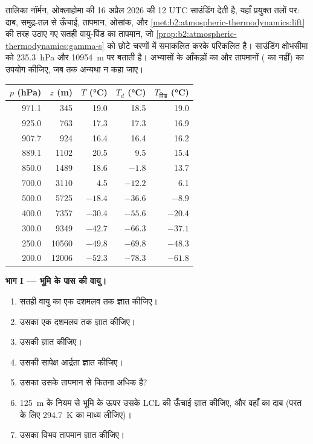 \begin{problem}[{सप्ताहांत समस्या --- सुबह की साउंडिंग पढ़ना}]\label{pb:b2:atmospheric-thermodynamics:1}
तालिका नॉर्मन, ओक्लाहोमा की 16 अप्रैल 2026 की 12 UTC साउंडिंग देती है, यहाँ प्रयुक्त
तलों पर: दाब, समुद्र-तल से ऊँचाई, तापमान, ओसांक, और
\cref{met:b2:atmospheric-thermodynamics:lift} की तरह उठाए गए सतही वायु-पिंड का तापमान, जो
\cref{prop:b2:atmospheric-thermodynamics:gamma-s} को छोटे चरणों में समाकलित करके परिकलित है। साउंडिंग
क्षोभसीमा को \qty{235.3}{hPa} और \qty{10954}{m} पर बताती है। अभ्यासों के आँकड़ों का और
तापमानों ( का नहीं) का उपयोग कीजिए, जब तक अन्यथा न कहा जाए।

\begin{center}
\small
\begin{tabular}{rrrrr}
\hline
$p$ (\unit{hPa}) & $z$ (\unit{m}) & $T$ (\unit{\celsius}) & $T_d$ (\unit{\celsius}) &
$T_{\text{पिंड}}$ (\unit{\celsius}) \\
\hline
971.1 & 345 & 19.0 & 18.5 & 19.0 \\
925.0 & 763 & 17.3 & 17.3 & 16.9 \\
907.7 & 924 & 16.4 & 16.4 & 16.2 \\
889.1 & 1102 & 20.5 & 9.5 & 15.4 \\
850.0 & 1489 & 18.6 & $-1.8$ & 13.7 \\
700.0 & 3110 & 4.5 & $-12.2$ & 6.1 \\
500.0 & 5725 & $-18.4$ & $-36.6$ & $-8.9$ \\
400.0 & 7357 & $-30.4$ & $-55.6$ & $-20.4$ \\
300.0 & 9349 & $-42.7$ & $-66.3$ & $-37.1$ \\
250.0 & 10560 & $-49.8$ & $-69.8$ & $-48.3$ \\
200.0 & 12006 & $-52.3$ & $-78.3$ & $-61.8$ \\
\hline
\end{tabular}
\end{center}

\medskip\noindent\textbf{भाग I --- भूमि के पास की वायु।}
\begin{enumerate}
  \item सतही वायु का  एक दशमलव तक ज्ञात कीजिए।
  \item उसका  एक दशमलव तक ज्ञात कीजिए।
  \item उसकी  ज्ञात कीजिए।
  \item उसकी सापेक्ष आर्द्रता ज्ञात कीजिए।
  \item उसका  उसके तापमान से कितना अधिक है?
  \item \qty{125}{m} के नियम से भूमि के ऊपर उसके LCL की ऊँचाई ज्ञात कीजिए, और वहाँ का
        दाब (परत के लिए \qty{294.7}{K} का माध्य  लीजिए)।
  \item उसका विभव तापमान ज्ञात कीजिए।
\end{enumerate}


\end{problem}

